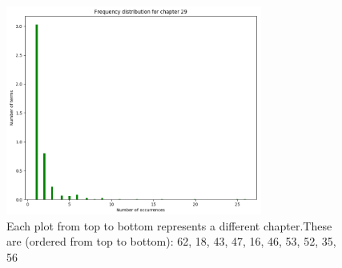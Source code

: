 \documentclass{article}
\begin{document}
\begin{flushleft}
\begin{figure}[H]
\begin{minipage}{0.45\linewidth}
			\includegraphics[width=0.75\textwidth]{./images/10-chapter_wise-frequency.png}
		\end{minipage}
		\caption{Each plot from top to bottom represents a different chapter.\newline{}These are (ordered from top to bottom): 62, 18, 43, 47, 16, 46, 53, 52, 35, 56}
	\end{figure}
\end{flushleft}
\end{document}
